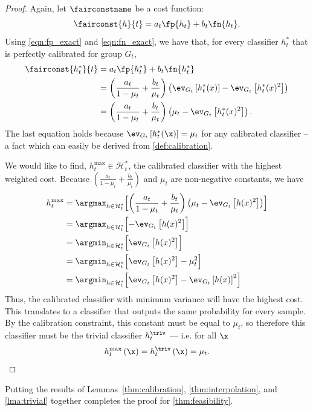 \begin{proof}
  Again, let $\fairconstname$ be a cost function:
  $$\fairconst{h}{t} = a_t \fp{h_t} + b_t \fn{h_t}.$$
  Using \eqref{eqn:fp_exact} and \eqref{eqn:fn_exact}, we have that, for every classifier $h^*_t$
  that is perfectly calibrated for group $G_t$,
  \begin{align*}
    \fairconst{h^*_t}{t} &= a_t \fp{h^*_t} + b_t \fn{h^*_t}
    \\&= \left( \frac{a_t}{1 - \mu_t} + \frac{b_t}{\mu_t} \right) \left( \ev_{G_t} \left[ h^*_t(x) \right] - \ev_{G_t} \left[ h^*_t(x)^2 \right] \right)
    \\&= \left( \frac{a_t}{1 - \mu_t} + \frac{b_t}{\mu_t} \right) \left( \mu_t - \ev_{G_t} \left[ h^*_t(x)^2 \right] \right).
  \end{align*}
  The last equation holds because $\ev_{G_t} \left[ h^*_t(\x) \right] = \mu_t$ for any calibrated
  classifier -- a fact which can easily be derived from \autoref{def:calibration}.

  We would like to find, $h^{\max}_t \in \mathcal{H}^*_t$, the calibrated classifier with the highest weighted cost.
  Because $\left( \frac{a_t}{1 - \mu_t} + \frac{b_t}{\mu_t} \right)$ and $\mu_t$ are non-negative constants, we have
  \begin{align*}
    h^{\max}_t &= \argmax_{h \in \mathcal{H}^*_t} \Bigl[ \left( \frac{a_t}{1 - \mu_t} + \frac{b_t}{\mu_t} \right) \left( \mu_t - \ev_{G_t} \left[ h(x)^2 \right] \right) \Bigr]
    \\&= \argmax_{h \in \mathcal{H}^*_t} \Bigl[ - \ev_{G_t} \left[ h(x)^2 \right] \Bigr]
    \\&= \argmin_{h \in \mathcal{H}^*_t} \Bigl[ \ev_{G_t} \left[ h(x)^2 \right] \Bigr]
    \\&= \argmin_{h \in \mathcal{H}^*_t} \Bigl[ \ev_{G_t} \left[ h(x)^2 \right] - \mu_t^2 \Bigr]
    \\&= \argmin_{h \in \mathcal{H}^*_t} \Bigl[ \ev_{G_t} \left[ h(x)^2 \right] - \ev_{G_t} \left[ h(x) \right]^2 \Bigr]
  \end{align*}
  Thus, the calibrated classifier with minimum variance will have the highest cost. This translates to
  a classifier that outputs the same probability for every sample. By the calibration constraint, this
  constant must be equal to $\mu_t$, so therefore this classifier must be the trivial classifier $h^\triv_t$ --- i.e.
  for all $\x$
  \[ h^{\max}_t \left( \x \right) = h^\triv_t \left( \x \right) = \mu_t. \]
\end{proof}
%
Putting the results of Lemmas~\ref{thm:calibration}, \ref{thm:interpolation}, and \ref{lma:trivial}
together
completes the proof for \autoref{thm:feasibility}.
%
%
%
%
